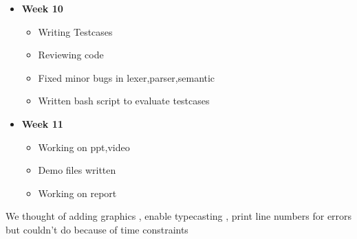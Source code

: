 \documentclass[english,a4paper,12pt]{report}
\begin{document}
\begin{itemize}
\begin{itemize}
        
    \end{itemize}
        \item\textbf{ Week 10} \begin{itemize}
        \item Writing Testcases
        \item Reviewing code
        \item Fixed minor bugs in lexer,parser,semantic
        \item Written bash script to evaluate testcases
       
    \end{itemize}
        \item\textbf{ Week 11} \begin{itemize}
        \item Working on ppt,video
        \item Demo files written
        \item Working on report
   
    \end{itemize}
       
    
    
\end{itemize}

We thought of adding graphics , enable typecasting , print line numbers for errors but couldn't do because of time constraints
\end{document}
